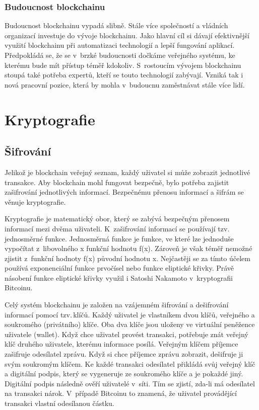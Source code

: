 \documentclass[12pt]{report}			%
\begin{document}
		\subsection{Budoucnost blockchainu}{
Budoucnost blockchainu vypadá slibně. Stále více společností a vládních organizací investuje do vývoje blockchainu. Jako hlavní cíl si dávají efektivnější využití blockchainu při automatizaci technologií a lepší fungování aplikací. Předpokládá se, že se v~brzké budoucnosti dočkáme veřejného systému, ke kterému bude mít přístup téměř kdokoliv. S~rostoucím vývojem blockchainu stoupá také potřeba expertů, kteří se touto technologií zabývají. Vzniká tak i nová pracovní pozice, která by mohla v~budoucnu zaměstnávat stále více lidí. \cite{Iredale2020} 
}
		\chapter{Kryptografie}
		\section{Šifrování}{
Jelikož je blockchain veřejný seznam, každý uživatel si může zobrazit jednotlivé transakce. Aby blockchain mohl fungovat bezpečně, bylo potřeba zajistit zašifrování jednotlivých informací. Bezpečnému přenosu informací a šifrám se věnuje kryptografie. 				
		
Kryptografie je matematický obor, který se zabývá bezpečným přenosem informací mezi dvěma uživateli. K~zašifrování informací se používají tzv.\,jednosměrné funkce. Jednosměrná funkce je funkce, ve které lze jednoduše vypočítat z~libovolného x funkční hodnotu f(x). Zároveň je však téměř nemožné zjistit z~funkční hodnoty f(x) původní hodnotu x. \cite{Burda2013} Nejčastěji se za tímto účelem používá exponenciální funkce prvočísel nebo funkce eliptické křivky. Právě násobení funkce eliptické křivky využil i Satoshi Nakamoto v~kryptografii Bitcoinu. \cite{Antonopoulos2017}

Celý systém blockchainu je založen na vzájemném šifrování a dešifrování informací pomocí tzv.\,klíčů. Každý uživatel je vlastníkem dvou klíčů, veřejného a soukromého (privátního) klíče. Oba dva klíče jsou uloženy ve virtuální peněžence uživatele (wallet). Když chce uživatel provést transakci, potřebuje znát veřejný klíč druhého uživatele, kterému informace posílá. Veřejným klíčem příjemce zašifruje odesílatel zprávu. Když si chce příjemce zprávu zobrazit, dešifruje ji svým soukromým klíčem. Ke každé transakci odesílatel přikládá svůj veřejný klíč a digitální podpis, který se vygeneruje ze soukromého klíče a je pokaždé jiný. Digitální podpis následně ověří uživatelé v~síti. Tím se zjistí, zda-li má odesílatel na transakci nárok. V~případě Bitcoinu to znamená, že uživatel provádějící transakci vlastní odesílanou částku. \cite{Antonopoulos2017}	
		}
\end{document}
